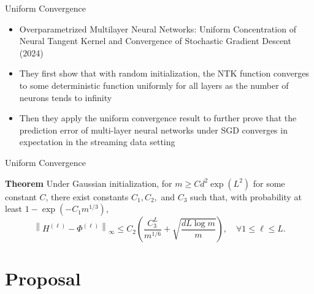 \documentclass[serif, aspectratio=169]{beamer}
\begin{document}
\begin{frame}{Uniform Convergence}
	\begin{itemize}
		
\item Overparametrized Multilayer Neural Networks: Uniform Concentration of Neural Tangent Kernel and Convergence of Stochastic Gradient Descent (2024)
\item They first show that with random initialization, the NTK function converges to some
deterministic function uniformly for all layers as the number of neurons tends to infinity
\item Then they apply the uniform convergence result to further prove that the prediction error of multi-layer neural networks under SGD converges in expectation in the streaming data setting
	\end{itemize}

\end{frame}


\begin{frame}{Uniform Convergence}

\textbf{Theorem} Under Gaussian initialization, for \( m \geq C d^2 \exp(L^2) \) for some constant \( C \), there exist constants \( C_1, C_2, \) and \( C_3 \) such that, with probability at least \( 1 - \exp(-C_1 m^{1/3}) \),
\[
\left\| H^{(\ell)} - \Phi^{(\ell)} \right\|_{\infty} \leq C_2 \left( \frac{C_3^L}{m^{1/6}} + \sqrt{\frac{d L \log m}{m}} \right), \quad \forall 1 \leq \ell \leq L.
\]

	
\end{frame}


\section{Proposal}

\end{document}

